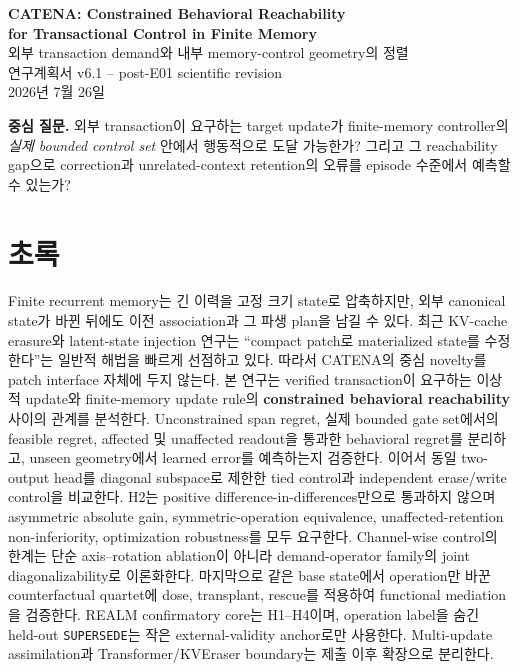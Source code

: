 \documentclass[10.5pt,a4paper]{article}
\newcommand{\op}[1]{\texttt{#1}}
\begin{document}
\begin{center}
{\LARGE\bfseries CATENA: Constrained Behavioral Reachability\\for Transactional Control in Finite Memory}\\[3mm]
{\large 외부 transaction demand와 내부 memory-control geometry의 정렬}\\[4mm]
{\normalsize 연구계획서 v6.1 -- post-E01 scientific revision}\\[2mm]
{\small 2026년 7월 26일}
\end{center}

\begin{keybox}
\textbf{중심 질문.} 외부 transaction이 요구하는 target update가 finite-memory controller의 \emph{실제 bounded control set} 안에서 행동적으로 도달 가능한가? 그리고 그 reachability gap으로 correction과 unrelated-context retention의 오류를 episode 수준에서 예측할 수 있는가?
\end{keybox}

\section*{초록}
Finite recurrent memory는 긴 이력을 고정 크기 state로 압축하지만, 외부 canonical state가 바뀐 뒤에도 이전 association과 그 파생 plan을 남길 수 있다. 최근 KV-cache erasure와 latent-state injection 연구는 ``compact patch로 materialized state를 수정한다''는 일반적 해법을 빠르게 선점하고 있다\citep{kveraser2026}. 따라서 CATENA의 중심 novelty를 patch interface 자체에 두지 않는다. 본 연구는 verified transaction이 요구하는 이상적 update와 finite-memory update rule의 \textbf{constrained behavioral reachability} 사이의 관계를 분석한다. Unconstrained span regret, 실제 bounded gate set에서의 feasible regret, affected 및 unaffected readout을 통과한 behavioral regret를 분리하고, unseen geometry에서 learned error를 예측하는지 검증한다. 이어서 동일 two-output head를 diagonal subspace로 제한한 tied control과 independent erase/write control을 비교한다. H2는 positive difference-in-differences만으로 통과하지 않으며 asymmetric absolute gain, symmetric-operation equivalence, unaffected-retention non-inferiority, optimization robustness를 모두 요구한다. Channel-wise control의 한계는 단순 axis--rotation ablation이 아니라 demand-operator family의 joint diagonalizability로 이론화한다. 마지막으로 같은 base state에서 operation만 바꾼 counterfactual quartet에 dose, transplant, rescue를 적용하여 functional mediation을 검증한다. REALM confirmatory core는 H1--H4이며, operation label을 숨긴 held-out \op{SUPERSEDE}는 작은 external-validity anchor로만 사용한다. Multi-update assimilation과 Transformer/KVEraser boundary는 제출 이후 확장으로 분리한다.
\end{document}
